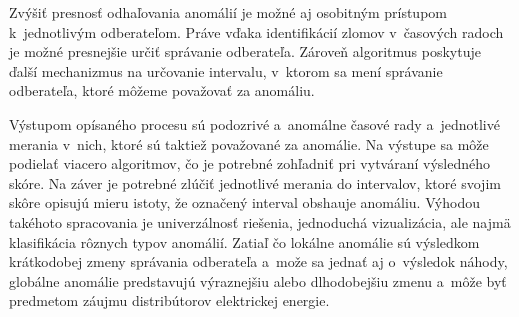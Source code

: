 \documentclass[a4paper,twoside,slovak,12pt,appendix]{article}
\begin{document}
Zvýšiť presnosť odhaľovania anomálií je možné aj osobitným prístupom
k~jednotlivým odberateľom. Práve vďaka identifikácií zlomov v~časových radoch je
možné presnejšie určiť správanie odberateľa. Zároveň algoritmus poskytuje ďalší
mechanizmus na určovanie intervalu, v~ktorom sa mení správanie odberateľa, ktoré
môžeme považovať za anomáliu.

Výstupom opísaného procesu sú podozrivé a~anomálne časové rady a~jednotlivé
merania v~nich, ktoré sú taktiež považované za anomálie. Na výstupe sa môže
podielať viacero algoritmov, čo je potrebné zohľadniť pri vytváraní výsledného
skóre. Na záver je potrebné zlúčiť jednotlivé merania do intervalov, ktoré
svojim skôre opisujú mieru istoty, že označený interval obshauje anomáliu.
Výhodou takéhoto spracovania je univerzálnosť riešenia, jednoduchá vizualizácia,
ale najmä klasifikácia rôznych typov anomálií. Zatiaľ čo lokálne anomálie sú
výsledkom krátkodobej zmeny správania odberateľa a~može sa jednať aj o~výsledok
náhody, globálne anomálie predstavujú výraznejšiu alebo dlhodobejšiu zmenu
a~môže byť predmetom záujmu distribútorov elektrickej energie.





\newpage



\end{document}
